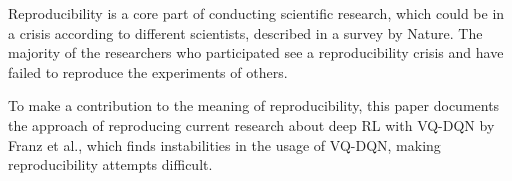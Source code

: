 Reproducibility is a core part of conducting scientific research, which could be in a crisis according to different scientists, described in a survey by Nature.
The majority of the researchers who participated see a reproducibility crisis and have failed to reproduce the experiments of others.\autocite{crisis}

To make a contribution to the meaning of reproducibility, this paper documents the approach of reproducing current research about deep \ac{RL} with \ac{VQ-DQN} by Franz et al.\autocite{instabilities}, which finds instabilities in the usage of \ac{VQ-DQN}, making reproducibility attempts difficult.

